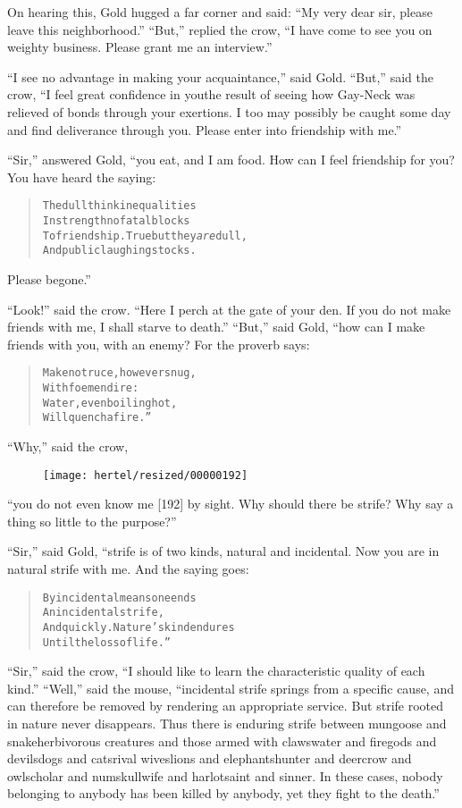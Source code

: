 \documentclass[article, twoside, 10pt]{memoir}
\renewenvironment{verbatim}{%
\begin{quote}%
\vskip -10pt%
\begin{alltt}\normalfont\small}{\end{alltt}%
\end{quote}%
\vskip -10pt
} %
\begin{document}
On hearing this, Gold hugged a far corner and said:
``My very dear sir, please leave this neighborhood.'' ``But,''
replied the crow,
``I have come to see you on weighty business. Please grant me an interview.''

``I see no advantage in making your acquaintance,'' said Gold.
``But,'' said the crow,
``I feel great confidence in you{\textemdash}the result of seeing how Gay-Neck was relieved of bonds through your exertions. I too may possibly be caught some day and find deliverance through you. Please enter into friendship with me.''

``Sir,'' answered Gold, “you eat, and I am food. How can I feel
friendship for you? You have heard the saying:

\begin{verbatim}
The dull think inequalities
    In strength no fatal blocks
To friendship. True{\textemdash}but they \emph{are} dull,
    And public laughingstocks.
\end{verbatim}
Please begone.”

``Look!'' said the crow.
``Here I perch at the gate of your den. If you do not make friends with me, I shall starve to death.''
``But,'' said Gold, “how can I make friends with you, with an
enemy? For the proverb says:

\begin{verbatim}
Make no truce, however snug,
    With foemen dire:
Water, even boiling hot,
    Will quench a fire.”
\end{verbatim}
``Why,'' said the crow,
\begin{figure}[p]\texttt{[image: hertel/resized/00000192]}\end{figure}``you do not even know me [192] by sight. Why should there be strife? Why say a thing so little to the purpose?''

``Sir,'' said Gold, “strife is of two kinds, natural and
incidental. Now you are in natural strife with me. And the saying
goes:

\begin{verbatim}
By incidental means one ends
    An incidental strife,
And quickly. Nature's kind endures
    Until the loss of life.”
\end{verbatim}
``Sir,'' said the crow,
``I should like to learn the characteristic quality of each kind.''
``Well,'' said the mouse,
``incidental strife springs from a specific cause, and can therefore be removed by rendering an appropriate service. But strife rooted in nature never disappears. Thus there is enduring strife between mungoose and snake{\textemdash}herbivorous creatures and those armed with claws{\textemdash}water and fire{\textemdash}gods and devils{\textemdash}dogs and cats{\textemdash}rival wives{\textemdash}lions and elephants{\textemdash}hunter and deer{\textemdash}crow and owl{\textemdash}scholar and numskull{\textemdash}wife and harlot{\textemdash}saint and sinner. In these cases, nobody belonging to anybody has been killed by anybody, yet they fight to the death.''
\end{document}
